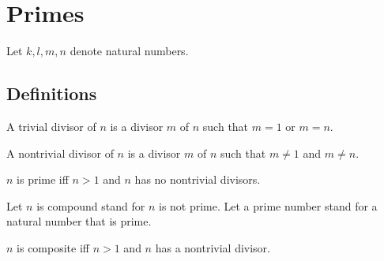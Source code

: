 \documentclass[../../natural-numbers.ftl.tex]{subfiles}
\begin{document}
  \section{Primes}

  \begin{forthel}
  \end{forthel}

  \begin{forthel}
  \end{forthel}

  \begin{forthel}
  \end{forthel}

  \begin{forthel}
  \end{forthel}

  \begin{forthel}
  \end{forthel}

  \begin{forthel}
    Let $k, l, m, n$ denote natural numbers.
  \end{forthel}


  \subsection{Definitions}

  \begin{forthel}
    \begin{definition}
      A trivial divisor of $n$ is a divisor $m$ of $n$ such that $m = 1$ or $m = n$.
    \end{definition}

    \begin{definition}
      A nontrivial divisor of $n$ is a divisor $m$ of $n$ such that $m \neq 1$ and $m \neq n$.
    \end{definition}

    \begin{definition}
      $n$ is prime iff $n > 1$ and $n$ has no nontrivial divisors.
    \end{definition}

    Let $n$ is compound stand for $n$ is not prime.
    Let a prime number stand for a natural number that is prime.

    \begin{definition}
      $n$ is composite iff $n > 1$ and $n$ has a nontrivial divisor.
    \end{definition}
  \end{forthel}
\end{document}
